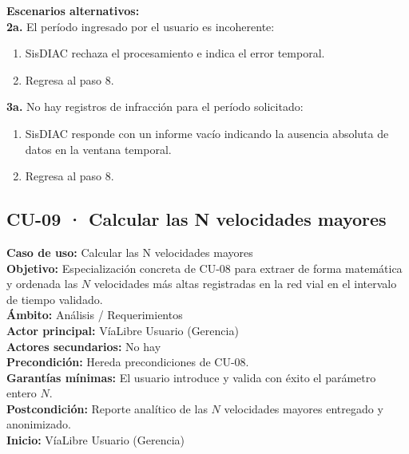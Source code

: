 \documentclass[12pt,letterpaper]{article}
\begin{document}
\noindent \textbf{Escenarios alternativos:} \\
\textbf{2a.} El período ingresado por el usuario es incoherente:
\begin{enumerate}[nosep]
	\item[2a1.] SisDIAC rechaza el procesamiento e indica el error temporal.
	\item[2a2.] Regresa al paso 8.
\end{enumerate}
\textbf{3a.} No hay registros de infracción para el período solicitado:
\begin{enumerate}[nosep]
	\item[3a1.] SisDIAC responde con un informe vacío indicando la ausencia absoluta de datos en la ventana temporal.
	\item[3a2.] Regresa al paso 8.
\end{enumerate}


\newpage
\subsection{CU-09 · Calcular las N velocidades mayores}

\noindent \textbf{Caso de uso:} Calcular las N velocidades mayores \\
\textbf{Objetivo:} Especialización concreta de CU-08 para extraer de forma matemática y ordenada las $N$ velocidades más altas registradas en la red vial en el intervalo de tiempo validado. \\
\textbf{Ámbito:} Análisis / Requerimientos \\
\textbf{Actor principal:} VíaLibre Usuario (Gerencia) \\
\textbf{Actores secundarios:} No hay \\
\textbf{Precondición:} Hereda precondiciones de CU-08. \\
\textbf{Garantías mínimas:} El usuario introduce y valida con éxito el parámetro entero $N$. \\
\textbf{Postcondición:} Reporte analítico de las $N$ velocidades mayores entregado y anonimizado. \\
\textbf{Inicio:} VíaLibre Usuario (Gerencia) \\
\end{document}
